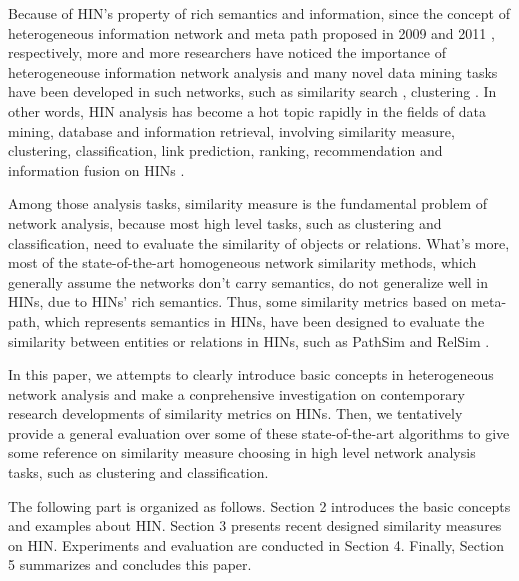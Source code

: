 \documentclass{acm_proc_article-csis8101}
\begin{document}
Because of HIN's property of rich semantics and information, since the concept of heterogeneous information network and meta path proposed in 2009 \cite{sun2009rankclus} and 2011 \cite{sun2011pathsim}, respectively, more and more researchers have noticed the importance of heterogeneouse information network analysis and many novel data mining tasks have been developed in such networks, such as similarity search \cite{shi2012relevance,sun2011pathsim}, clustering \cite{sun2013pathselclus}. In other words, HIN analysis has become a hot topic rapidly in the fields of data mining, database and information retrieval, involving similarity measure, clustering, classification, link prediction, ranking, recommendation and information fusion on HINs \cite{shi2017survey}.

Among those analysis tasks, similarity measure is the fundamental problem of network analysis, because most high level tasks, such as clustering and classification, need to evaluate the similarity of objects or relations. What's more, most of the state-of-the-art homogeneous network similarity methods, which generally assume the networks don't carry semantics, do not generalize well in HINs, due to HINs' rich semantics. Thus, some similarity metrics based on meta-path, which represents semantics in HINs, have been designed to evaluate the similarity between entities or relations in HINs, such as PathSim \cite{sun2011pathsim} and RelSim \cite{wang2016relsim}.

In this paper, we attempts to clearly introduce basic concepts in heterogeneous network analysis and make a conprehensive investigation on contemporary research developments of similarity metrics on HINs. Then, we tentatively provide a general evaluation over some of these state-of-the-art algorithms to give some reference on similarity measure choosing in high level network analysis tasks, such as clustering and classification.

The following part is organized as follows. Section 2 introduces the basic concepts and examples about HIN. Section 3 presents recent designed similarity measures on HIN. Experiments and evaluation are conducted in Section 4. Finally, Section 5 summarizes and concludes this paper.

\end{document}
